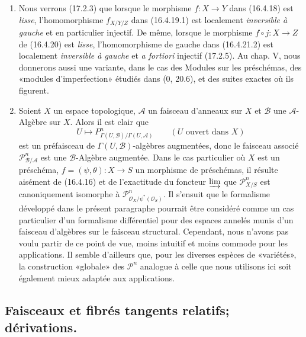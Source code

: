 \begin{remarks}[16.4.24]
\label{IV.16.4.24}
\begin{enumerate}
\item[(i)] Nous verrons (17.2.3) que lorsque le morphisme $f:X\to Y$ dans
(16.4.18) est \emph{lisse}, l'homomorphisme $f_{X/Y/Z}$ dans (16.4.19.1) est
localement \emph{inversible à gauche} et en particulier injectif. De même,
lorsque le morphisme $f\circ j:X\to Z$ de (16.4.20) est \emph{lisse},
l'homomorphisme de gauche dans (16.4.21.2) est localement
\emph{inversible à gauche} et \emph{a fortiori} injectif (17.2.5). Au chap. V,
nous donnerons aussi une variante, dans le cas des Modules sur les
préschémas, des «modules d'imperfection» étudiés dans (0, 20.6), et des suites
exactes où ils figurent.

\item[(ii)] Soient $X$ un espace topologique, $\mathscr{A}$ un faisceau
d'anneaux sur $X$ et $\mathscr{B}$ une $\mathscr{A}$-Algèbre sur $X$. Alors il
est clair que
\[
  U\longmapsto
  P_{\Gamma(U,\mathscr{B})/\Gamma(U,\mathscr{A})}^n
  \qquad (U\text{ ouvert dans }X)
\]
est un préfaisceau de $\Gamma(U,\mathscr{B})$-algèbres augmentées, donc le
faisceau associé $\mathscr{P}_{\mathscr{B}/\mathscr{A}}^n$ est une
$\mathscr{B}$-Algèbre augmentée. Dans le cas particulier où $X$ est un
préschéma, $f=(\psi,\theta):X\to S$ un morphisme de préschémas, il résulte
aisément de (16.4.16) et de l'exactitude du foncteur $\varinjlim$ que
$\mathscr{P}_{X/S}^n$ est canoniquement isomorphe à
$\mathscr{P}_{\mathcal{O}_X/\psi^*(\mathcal{O}_S)}^n$. Il s'ensuit que le
formalisme développé dans le présent paragraphe pourrait être considéré comme
un
cas particulier d'un formalisme différentiel pour des espaces annelés munis
d'un faisceau d'algèbres sur le faisceau structural. Cependant, nous n'avons
pas voulu partir de ce point de vue, moins intuitif et moins commode pour les
applications. Il semble d'ailleurs que, pour les diverses espèces de
«variétés», la construction «globale» des $\mathscr{P}^n$ analogue à celle que
nous utilisons ici soit également mieux adaptée aux applications.
\end{enumerate}
\end{remarks}

\subsection{Faisceaux et fibrés tangents relatifs; dérivations.}
\label{IV.16.5}

